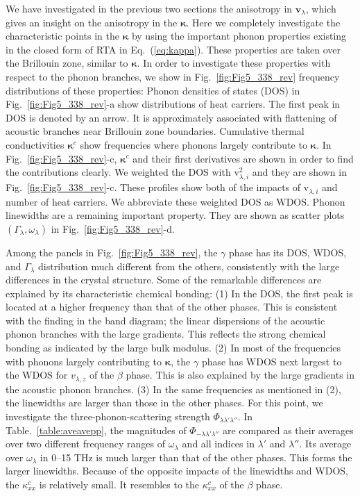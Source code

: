 \documentclass[twocolumn,amsmath,amssymb,a4paper,prb,superscriptaddress,floatfix]{revtex4-1}
\begin{document}
We have investigated in the previous two sections the anisotropy in
$\mathbf{v}_\lambda$, which gives an insight on the anisotropy in the
$\boldsymbol{\kappa}$. Here we completely investigate the characteristic points
in the $\boldsymbol{\kappa}$ by using the important phonon properties existing
in the closed form of RTA in Eq.~(\ref{eq:kappa}). These properties are taken
over the Brillouin zone, similar to $\boldsymbol{\kappa}$.
In order to investigate these properties with respect to the
phonon branches, we show in Fig.~\ref{fig:Fig5_338_rev} frequency
distributions of these properties: Phonon densities of states (DOS) in
Fig.~\ref{fig:Fig5_338_rev}-a show distributions of heat carriers. 
The first peak in DOS is denoted by an arrow. It is approximately associated
with flattening of acoustic branches near Brillouin zone boundaries.
Cumulative thermal conductivities $\boldsymbol{\kappa}^c$ 
show frequencies where phonons largely
contribute to $\boldsymbol{\kappa}$.  In Fig.~\ref{fig:Fig5_338_rev}-c,
$\boldsymbol{\kappa}^c$ and their
first derivatives are shown
in order to find the contributions clearly. We weighted the DOS with
\rm{v}$_{\lambda,i}^2$ and they are shown in Fig.~\ref{fig:Fig5_338_rev}-c. These
profiles show both of the impacts of \rm{v}$_{\lambda,i}$ and number of heat
carriers. We abbreviate these weighted DOS as WDOS. Phonon linewidths are a 
remaining important property.  They are shown as scatter plots $(\Gamma_\lambda,
\omega_\lambda)$ in Fig.~\ref{fig:Fig5_338_rev}-d. 

Among the panels in Fig.~\ref{fig:Fig5_338_rev}, the $\gamma$ phase has its DOS,
WDOS, and
$\Gamma_\lambda$ distribution much different from
the others, consistently with the large
differences in the crystal structure. Some of the remarkable differences are
explained by its characteristic chemical bonding: (1) In the DOS, the first peak is located at
a higher frequency than that of the other phases. This is consistent with the
finding in the band diagram; the linear dispersions of the acoustic phonon
branches with the large gradients. This reflects the strong chemical bonding as
indicated by the large bulk modulus. (2) In most of the frequencies with phonons
largely contributing to $\boldsymbol{\kappa}$, the $\gamma$ phase has WDOS 
next largest to the WDOS for $v_{\lambda,z}$ of the $\beta$ phase.
This is also explained by the large gradients in the acoustic phonon branches.
(3) In the same frequencies as mentioned in (2), the linewidths are larger than
those in the other phases. For this point, we investigate the
three-phonon-scattering strength $\Phi_{\lambda\lambda'\lambda''}$.  In
Table.~\ref{table:aveavepp}, the magnitudes of
$\Phi_{-\lambda\lambda'\lambda''}$ are compared as their averages over two
different
frequency ranges of $\omega_\lambda$ and all indices in $\lambda'$ and
$\lambda''$. Its average over $\omega_\lambda$ in 0--15 THz is much larger than
that of the other phases. This forms the larger linewidths.
Because of the opposite impacts of the linewidths and WDOS, the $\kappa^c_{xx}$
is relatively small. It resembles to the $\kappa^c_{xx}$ of the
$\beta$ phase.
\end{document}
